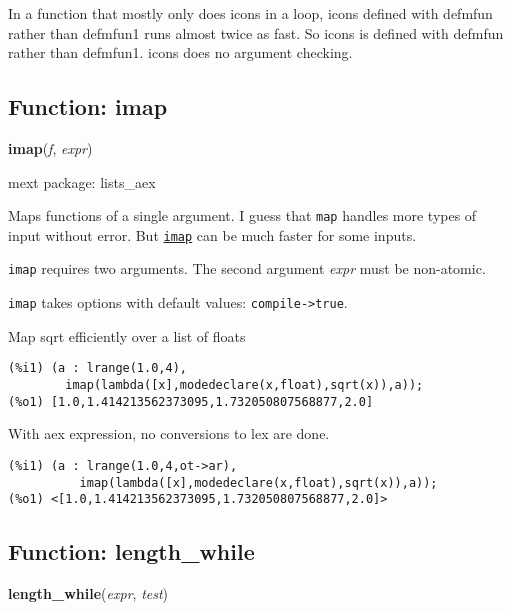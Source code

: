 \documentclass[]{article}
\begin{document}
\vspace{5 pt}


In a function that mostly only does icons in a loop, icons defined with defmfun rather than defmfun1 runs almost twice as fast. So icons is defined with defmfun rather than defmfun1. icons does no argument checking. 

\vspace{5 pt}


\subsection{Function: imap\label{sec:imap}}
\hypertarget{imap}{}
{\bf imap}({\it f}, {\it expr})


\noindent mext package: lists\_aex



\vspace{5 pt}
Maps functions of a single argument. I guess that {\tt map} handles more types of input without error. But \hyperlink{imap}{{\tt imap}} can be much faster for some inputs. 

\vspace{5 pt}

   {\tt imap} requires two arguments.
    The second argument {\it expr} must be non-atomic.


\vspace{5 pt}

{\tt imap} takes options with default values: {\tt compile->true}.
\vspace{5 pt}


   Map sqrt efficiently over a list of floats 

\begin{Verbatim}[frame=single]
(%i1) (a : lrange(1.0,4),
        imap(lambda([x],modedeclare(x,float),sqrt(x)),a));
(%o1) [1.0,1.414213562373095,1.732050807568877,2.0]
\end{Verbatim}

   With aex expression, no conversions to lex are done. 

\begin{Verbatim}[frame=single]
(%i1) (a : lrange(1.0,4,ot->ar),
          imap(lambda([x],modedeclare(x,float),sqrt(x)),a));
(%o1) <[1.0,1.414213562373095,1.732050807568877,2.0]>
\end{Verbatim}


\subsection{Function: length\_while\label{sec:length_while}}
\hypertarget{length_while}{}
{\bf length\_while}({\it expr}, {\it test})
\end{document}

